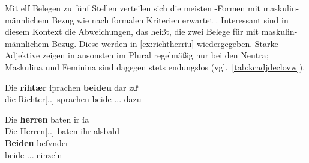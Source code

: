 Mit elf Belegen zu fünf Stellen verteilen sich die meisten
-Formen mit maskulin-männlichem Bezug wie nach formalen Kriterien
erwartet \autocite[vgl.][182]{ksw2}. Interessant sind in diesem Kontext die
Abweichungen, das heißt, die zwei Belege für  mit
maskulin-männlichem Bezug. Diese werden in \cref{ex:richtherriu} wiedergegeben.
Starke Adjektive zeigen in \citet{kc:B1} ansonsten  im Plural
regel\-mäßig nur bei den Neutra; Maskulina und Feminina sind dagegen stets
endungslos (vgl.~\cref{tab:kcadjdeclovw}).

\begin{exe}
\ex \label{ex:richtherriu}
	\begin{xlist}
	\ex \gll Die \textbf{rihtær} ſprachen \textbf{beideu} {dar zuͦ} \\
			die Richter[\Nom.\Pl.\MascM] sprachen beide-\Nom.\Pl.\NeutM.\St{}
			dazu \\
		\begin{taggedline}{\parencites[\pno~28\ra, 8]{kc:B1}[vgl.~abweichend][10090]{schroeder1895}} %
		\trans {}
		\end{taggedline}
		\label{ex:richtherriu_1}

	\ex \gll Die \textbf{herren} baten ir ſa \\
			Die Herren[\Nom.\Pl.\MascM] baten ihr alsbald \\
	\sn \gll \textbf{Beideu} beſvnder \\
			beide-\Nom.\Pl.\NeutM.\St{} einzeln \\
		\begin{taggedline}{\parencites[\pno~31\va, 48--49]{kc:B1}[vgl.][11385--11386]{schroeder1895}} %
		\trans {}
		\end{taggedline}
		\label{ex:richtherriu_2}
	\end{xlist}
\end{exe}



